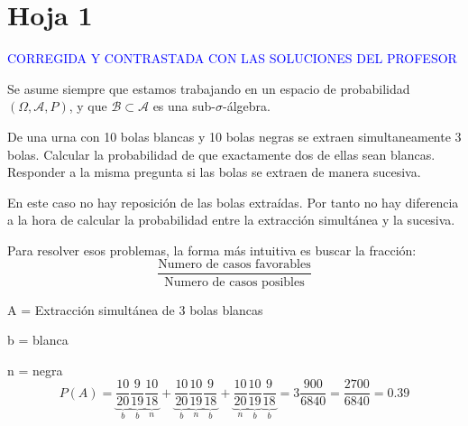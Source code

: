 %
%
%

\section{Hoja 1}

\textcolor{blue}{CORREGIDA Y CONTRASTADA CON LAS SOLUCIONES DEL PROFESOR}

Se asume siempre que estamos trabajando en un espacio de probabilidad $(\Omega, \mathcal{A}, P)$, y que  $\mathcal{B}\subset \mathcal{A}$ es una sub-$\sigma$-\'algebra.

\begin{problem}[1]De una urna con 10 bolas blancas y 10 bolas negras se extraen simultaneamente 3 bolas. 
Calcular la probabilidad de que exactamente dos de ellas sean blancas. Responder a la misma
pregunta si las bolas se extraen de manera sucesiva.
\solution

\begin{expla}
En este caso no hay reposición de las bolas extraídas. Por tanto no hay diferencia a la hora de calcular la probabilidad entre la extracción simultánea y la sucesiva.

Para resolver esos problemas, la forma más intuitiva es buscar la fracción:
\[
\frac{\text{Numero de casos favorables}}{\text{Numero de casos posibles}}
\]
\end{expla}
A = Extracción simultánea de 3 bolas blancas

b = blanca

n = negra
\[
P(A)=\underbrace{\frac{10}{20}}_{b}\underbrace{\frac{9}{19}}_{b}\underbrace{\frac{10}{18}}_{n}+\underbrace{\frac{10}{20}}_{b}\underbrace{\frac{10}{19}}_{n}\underbrace{\frac{9}{18}}_{b}+\underbrace{\frac{10}{20}}_{n}\underbrace{\frac{10}{19}}_{b}\underbrace{\frac{9}{18}}_{b} = 3\frac{900}{6840}=\frac{2700}{6840}=0.39
\]

\end{problem}


